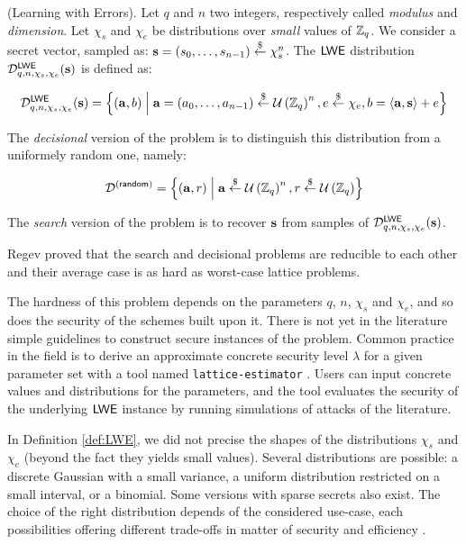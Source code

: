 \begin{definition}
	(Learning with Errors). Let $q$ and $n$ two integers, respectively called \textit{modulus} and \textit{dimension}.  Let $\chi_s$ and $\chi_e$ be distributions over \textit{small} values of $\mathbb{Z}_q$. We consider a secret vector, sampled as: $\mathbf s = (s_0, \dots, s_{n-1}) \overset{\$}{\leftarrow} \chi_s^n$. The $\textsf{LWE}$ distribution $\mathcal{D}_{q, n, \chi_s, \chi_e}^{\textsf{LWE}}(\mathbf s)$ is defined as:
	
	 \[
	 \mathcal{D}_{q, n, \chi_s, \chi_e}^{\textsf{LWE}}(\mathbf s) = \left \{(\mathbf a, b) \;\middle|\; \mathbf a = (a_0, \dots, a_{n-1}) \overset{\$}{\leftarrow} \mathcal U \left ( \mathbb{Z}_q \right )^n, e \overset{\$}{\leftarrow} \chi_e, b = \left \langle \mathbf a, \mathbf s \right \rangle + e \right \}
	  \]
	 
	 The \textit{decisional} version of the problem is to distinguish this distribution from a uniformely random one, namely:
	
	\[
	\mathcal{D}^{(\textsf{random})} = \left \{(\mathbf a, r) \;\middle|\; \mathbf a \overset{\$}{\leftarrow} \mathcal U \left ( \mathbb{Z}_q \right )^n, r \overset{\$}{\leftarrow} \mathcal U \left ( \mathbb{Z}_q \right ) \right\}
	\]

	The \emph{search} version of the problem is to recover $\mathbf s$ from samples of $\mathcal{D}_{q, n, \chi_s, \chi_e}^{\textsf{LWE}}(\mathbf s)$. 
	\label{def:LWE}
\end{definition}


Regev proved that the search and decisional problems are reducible to each other and their average case is as hard as worst-case lattice problems.

The hardness of this problem depends on the parameters $q$, $n$, $\chi_s$ and $\chi_e$, and so does the security of the schemes built upon it. There is not yet in the literature simple guidelines to construct secure instances of the problem. Common practice in the field is to derive an approximate concrete security level $\lambda$ for a given parameter set with a tool named \texttt{lattice-estimator} \cite{lattice-estimator}. Users can input concrete values and distributions for the parameters, and the tool evaluates the security of the underlying $\textsf{LWE}$ instance by running simulations of attacks of the literature.

In Definition \ref{def:LWE}, we did not precise the shapes of the distributions $\chi_s$ and $\chi_e$ (beyond the fact they yields small values). Several distributions are possible: a discrete Gaussian with a small variance, a uniform distribution restricted on a small interval, or a binomial. Some versions with sparse secrets also exist. The choice of the right distribution depends of the considered use-case, each possibilities offering different trade-offs in matter of security and efficiency \cite{AFRICACRYPT:BGPW16, DBLP:conf/ccs/CurtisP19, EPRINT:BGPT19, EPRINT:SLZS24}.


